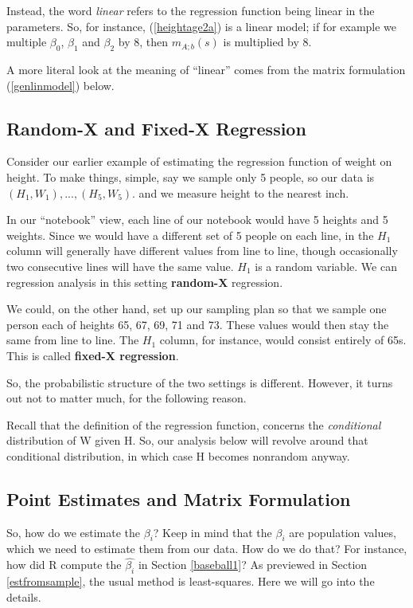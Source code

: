 Instead, the word {\it linear} refers to the regression function being
linear in the parameters.  So, for instance, (\ref{heightage2a}) is a
linear model; if for example we multiple $\beta_0$, $\beta_1$ and
$\beta_2$ by 8, then $m_{A;b}(s)$ is multiplied by 8.

A more literal look at the meaning of ``linear'' comes from the matrix
formulation (\ref{genlinmodel}) below.


\subsection{Random-X and Fixed-X Regression}

Consider our earlier example of estimating the regression function of
weight on height.  To make things, simple, say we sample only 5 people,
so our data is $(H_1,W_1),...,(H_5,W_5)$. and we measure height to the
nearest inch.

In our ``notebook'' view, each line of our notebook would have 5 heights
and 5 weights.  Since we would have a different set of 5 people on each
line, in the $H_1$ column will generally have different values from line
to line, though occasionally two consecutive lines will have the same
value.  $H_1$ is a random variable.  We can regression analysis in this
setting {\bf random-X} regression.

We could, on the other hand, set up our sampling plan so that we sample
one person each of heights 65, 67, 69, 71 and 73.  These values would
then stay the same from line to line.  The $H_1$ column, for instance,
would consist entirely of 65s.  This is called {\bf fixed-X regression}.

So, the probabilistic structure of the two settings is different.
However, it turns out not to matter much, for the following reason.

Recall that the definition of the regression function, concerns the {\it
conditional} distribution of W given H.  So, our analysis below will
revolve around that conditional distribution, in which case H becomes
nonrandom anyway.

\subsection{Point Estimates and Matrix Formulation}
\label{howestbeta}

So, how do we estimate the $\beta_i$?  Keep in mind that the $\beta_i$
are population values, which we need to estimate them from our data.
How do we do that?  For instance, how did R compute the
$\widehat{\beta_i}$ in Section \ref{baseball1}?  As previewed in Section
\ref{estfromsample}, the usual method is least-squares.  Here we will go
into the details.

